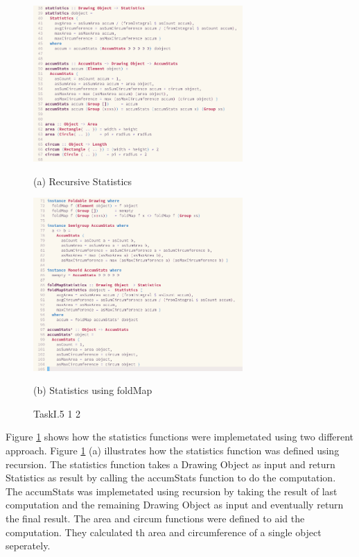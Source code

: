 \documentclass{article}
\begin{document}
\begin{normalsize}
\begin{figure}[H]
    \begin{minipage}[b]{0.48\linewidth}
      \centering
      \centerline{\includegraphics[width=8.0cm]{Stats}}
      \centerline{ (a) Recursive Statistics}\medskip
    \end{minipage}
    \hfill
    \begin{minipage}[b]{0.48\linewidth}
      \centering
      \centerline{\includegraphics[width=8.0cm]{StatsFoldMap}}
      \centerline{ (b) Statistics using foldMap}\medskip
    \end{minipage}
    \caption{TaskI.5 1 2}
    \label{fig:taskI.5.1.2}
  \end{figure}

  Figure \ref{fig:taskI.5.1.2} shows how the statistics functions were
  implemetated using two different approach. Figure \ref{fig:taskI.5.1.2} (a)
  illustrates how the statistics function was defined using recursion. The
  statistics function takes a Drawing Object as input and return Statistics as
  result by calling the accumStats function to do the computation. The
  accumStats was implemetated using recursion by taking the result of last
  computation and the remaining Drawing Object  as input and eventually return
  the final result. The area and circum functions were defined to aid the
  computation. They calculated th area and circumference of a single object
  seperately.


\end{normalsize}
\end{document}
